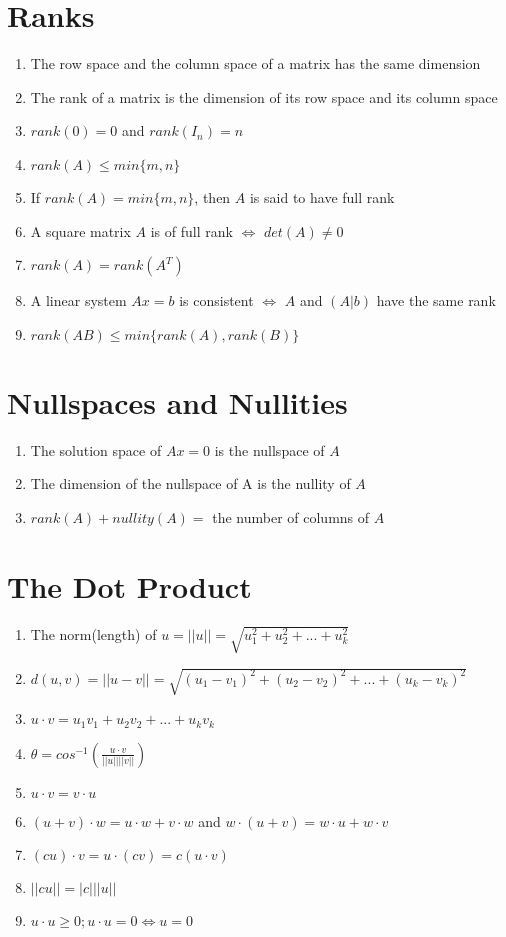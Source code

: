 \documentclass{article}
\begin{document}
\section*{Ranks}
\begin{enumerate}
\item The row space and the column space of a matrix has the same dimension
\item The rank of a matrix is the dimension of its row space and its column space
\item $rank(0) = 0$ and $rank(I_n) = n$
\item $rank(A) \leq min\{m, n\}$
\item If $rank(A) = min\{m, n\}$, then $A$ is said to have full rank
\item A square matrix $A$ is of full rank $\Leftrightarrow$ $det(A) \neq 0$
\item $rank(A) = rank(A^T)$
\item A linear system $Ax = b$ is consistent $\Leftrightarrow$ $A$ and $(A|b)$ have the same rank
\item $rank(AB) \leq min\{rank(A), rank(B)\}$
\end{enumerate}

\section*{Nullspaces and Nullities}
\begin{enumerate}
\item The solution space of $Ax = 0$ is the nullspace of $A$
\item The dimension of the nullspace of A is the nullity of $A$
\item $rank(A) + nullity(A) =$ the number of columns of $A$
\end{enumerate}

\section*{The Dot Product}
\begin{enumerate}
\item The norm(length) of $u = ||u|| = \sqrt{u_1^2 + u_2^2 + ... + u_k^2}$
\item $d(u, v) = ||u - v|| = \sqrt{(u_1 - v_1)^2 + (u_2 - v_2)^2 + ... + (u_k - v_k)^2}$
\item $u \cdot v = u_1v_1 + u_2v_2 + ... + u_kv_k$
\item $\theta = cos^{-1}(\frac{u \cdot v}{||u|| ||v||})$
\item $u \cdot v = v \cdot u$
\item $(u + v) \cdot w = u \cdot w + v \cdot w$ and $w \cdot (u + v) = w \cdot u + w \cdot v$
\item $(cu) \cdot v = u \cdot (cv) = c(u \cdot v)$
\item $||cu|| = |c| ||u||$
\item $u \cdot u \geq 0; u \cdot u = 0 \Leftrightarrow u = 0$
\end{enumerate}
\end{document}
